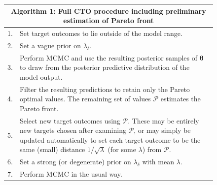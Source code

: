 \documentclass[12pt]{article}
\begin{document}
\begin{figure}
\centering
\begin{tabular}{|l|p{5.5in}|}
\hline
\multicolumn{2}{|c|}{Algorithm 1: Full CTO procedure including preliminary estimation of Pareto front}\\
\hline
1.&Set target outcomes to lie outside of the model range.\\
2.&  Set a vague prior on $\lambda_\delta$.\\
3.&  Perform MCMC and use the resulting posterior samples of $\boldsymbol\theta$ to draw from the posterior predictive distribution of the model output.\\
4.&  Filter the resulting predictions to retain only the Pareto optimal values. The remaining set of values $\mathcal P$ estimates the Pareto front.\\
5.& Select new target outcomes using $\mathcal P$. These may be entirely new targets chosen after examining $\mathcal P$, or may simply be updated automatically to set each target outcome to be the same (small) distance $1/\sqrt{\lambda}$ (for some $\lambda$) from $\mathcal P$.\\
6.& Set a strong (or degenerate) prior on $\lambda_\delta$ with mean $\lambda$.\\
7.& Perform MCMC in the usual way.\\
\hline
\end{tabular}
\label{alg:CDO_alg}
\end{figure}
\end{document}
